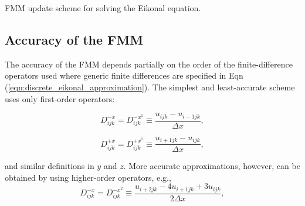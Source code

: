 		\begin{algorithm}
			\SetAlgoLined
			\caption{FMM update scheme for solving the Eikonal equation.}
			\label{alg:fmm_update}
		\end{algorithm}

		

	\subsection{Accuracy of the FMM}
		The accuracy of the FMM depends partially on the order of the finite-difference operators used where generic finite differences are specified in Eqn (\ref{eqn:discrete_eikonal_approximation}). The simplest and least-accurate scheme uses only first-order operators:
		
		\begin{equation}
			D^{-x}_{ijk} = D^{-x^1}_{ijk} \equiv \frac{u_{ijk}-u_{i-1jk}}{\Delta x},
		\end{equation}
		
		\begin{equation}
			D^{+x}_{ijk} = D^{+x^1}_{ijk} \equiv \frac{u_{i+1jk}-u_{ijk}}{\Delta x},
		\end{equation}
		
		\noindent and similar definitions in $y$ and $z$. More accurate approximations, however, can be obtained by using higher-order operators, e.g.,
		\begin{equation}
			D^{-x}_{ijk} = D^{-x^2}_{ijk} \equiv \frac{u_{i+2jk}-4u_{i+1jk}+3u_{ijk}}{2\Delta x},
		\end{equation}
		
